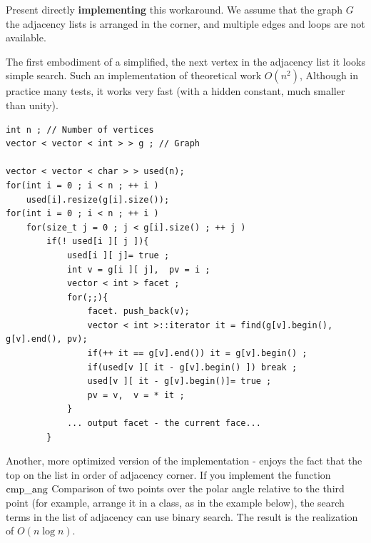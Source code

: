 Present directly \textbf{implementing} this workaround. We assume that the graph $G$ the adjacency lists is arranged in the corner, and multiple edges and loops are not available.

The first embodiment of a simplified, the next vertex in the adjacency list it looks simple search. Such an implementation of theoretical work $O (n ^ 2)$, Although in practice many tests, it works very fast (with a hidden constant, much smaller than unity).

\begin{verbatim}
int n ; // Number of vertices
vector < vector < int > > g ; // Graph
 
vector < vector < char > > used(n);
for(int i = 0 ; i < n ; ++ i )
    used[i].resize(g[i].size());
for(int i = 0 ; i < n ; ++ i )
    for(size_t j = 0 ; j < g[i].size() ; ++ j )
        if(! used[i ][ j ]){
            used[i ][ j]= true ;
            int v = g[i ][ j],  pv = i ;
            vector < int > facet ;
            for(;;){
                facet. push_back(v);
                vector < int >::iterator it = find(g[v].begin(), g[v].end(), pv);
                if(++ it == g[v].end()) it = g[v].begin() ;
                if(used[v ][ it - g[v].begin() ]) break ;
                used[v ][ it - g[v].begin()]= true ;
                pv = v,  v = * it ;
            }
            ... output facet - the current face...
        } 
\end{verbatim}
Another, more optimized version of the implementation - enjoys the fact that the top on the list in order of adjacency corner. If you implement the function $\rm cmp \_ang$ Comparison of two points over the polar angle relative to the third point (for example, arrange it in a class, as in the example below), the search terms in the list of adjacency can use binary search. The result is the realization of $O (n \log n)$.

